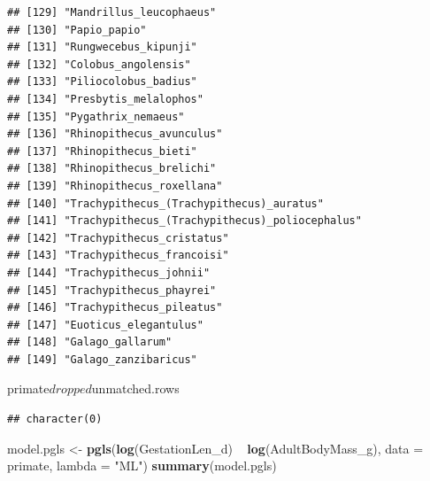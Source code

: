 \documentclass[]{article}
\newenvironment{Shaded}{\begin{snugshade}}{\end{snugshade}}
\newcommand{\KeywordTok}[1]{\textcolor[rgb]{0.13,0.29,0.53}{\textbf{{#1}}}}
\newcommand{\DataTypeTok}[1]{\textcolor[rgb]{0.13,0.29,0.53}{{#1}}}
\newcommand{\StringTok}[1]{\textcolor[rgb]{0.31,0.60,0.02}{{#1}}}
\newcommand{\NormalTok}[1]{{#1}}
\begin{document}
\begin{verbatim}
## [129] "Mandrillus_leucophaeus"                       
## [130] "Papio_papio"                                  
## [131] "Rungwecebus_kipunji"                          
## [132] "Colobus_angolensis"                           
## [133] "Piliocolobus_badius"                          
## [134] "Presbytis_melalophos"                         
## [135] "Pygathrix_nemaeus"                            
## [136] "Rhinopithecus_avunculus"                      
## [137] "Rhinopithecus_bieti"                          
## [138] "Rhinopithecus_brelichi"                       
## [139] "Rhinopithecus_roxellana"                      
## [140] "Trachypithecus_(Trachypithecus)_auratus"      
## [141] "Trachypithecus_(Trachypithecus)_poliocephalus"
## [142] "Trachypithecus_cristatus"                     
## [143] "Trachypithecus_francoisi"                     
## [144] "Trachypithecus_johnii"                        
## [145] "Trachypithecus_phayrei"                       
## [146] "Trachypithecus_pileatus"                      
## [147] "Euoticus_elegantulus"                         
## [148] "Galago_gallarum"                              
## [149] "Galago_zanzibaricus"
\end{verbatim}

\begin{Shaded}
\begin{Highlighting}[]
\NormalTok{primate$dropped$unmatched.rows}
\end{Highlighting}
\end{Shaded}

\begin{verbatim}
## character(0)
\end{verbatim}

\begin{Shaded}
\begin{Highlighting}[]
\NormalTok{model.pgls <-}\StringTok{ }\KeywordTok{pgls}\NormalTok{(}\KeywordTok{log}\NormalTok{(GestationLen_d) ~}\StringTok{ }\KeywordTok{log}\NormalTok{(AdultBodyMass_g), }\DataTypeTok{data =} \NormalTok{primate, }
    \DataTypeTok{lambda =} \StringTok{"ML"}\NormalTok{)}
\KeywordTok{summary}\NormalTok{(model.pgls)}
\end{Highlighting}
\end{Shaded}
\end{document}
